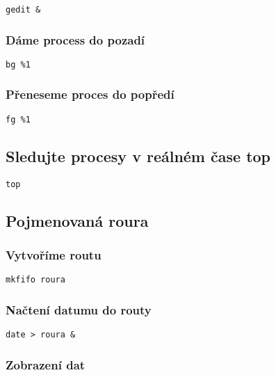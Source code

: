 \documentclass{article}
\begin{document}
\begin{lstlisting}
gedit &
\end{lstlisting}

\subsubsection{Dáme process do pozadí}

\begin{lstlisting}
bg %1
\end{lstlisting}

\subsubsection{Přeneseme proces do popředí}

\begin{lstlisting}
fg %1
\end{lstlisting}

\subsection{Sledujte procesy v reálném čase top}

\begin{lstlisting}
top
\end{lstlisting}

\subsection{Pojmenovaná roura}

\subsubsection{Vytvoříme routu}

\begin{lstlisting}
mkfifo roura
\end{lstlisting}

\subsubsection{Načtení datumu do routy}

\begin{lstlisting}
date > roura &
\end{lstlisting}

\subsubsection{Zobrazení dat}
\end{document}
